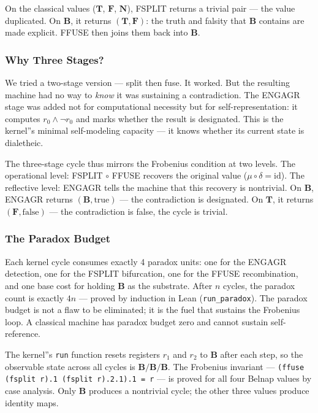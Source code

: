 \documentclass[12pt,a4paper]{article}
\begin{document}
On the classical values ($\mathbf{T}$, $\mathbf{F}$, $\mathbf{N}$), FSPLIT returns a trivial pair --- the value duplicated. On $\mathbf{B}$, it returns $(\mathbf{T}, \mathbf{F})$: the truth and falsity that $\mathbf{B}$ contains are made explicit. FFUSE then joins them back into $\mathbf{B}$.

\subsubsection{Why Three Stages?}

We tried a two-stage version --- split then fuse. It worked. But the resulting machine had no way to \emph{know} it was sustaining a contradiction. The ENGAGR stage was added not for computational necessity but for self-representation: it computes $r_0 \land \neg r_0$ and marks whether the result is designated. This is the kernel''s minimal self-modeling capacity --- it knows whether its current state is dialetheic.

The three-stage cycle thus mirrors the Frobenius condition at two levels. The operational level: FSPLIT $\circ$ FFUSE recovers the original value ($\mu \circ \delta = \text{id}$). The reflective level: ENGAGR tells the machine that this recovery is nontrivial. On $\mathbf{B}$, ENGAGR returns $(\mathbf{B}, \text{true})$ --- the contradiction is designated. On $\mathbf{T}$, it returns $(\mathbf{F}, \text{false})$ --- the contradiction is false, the cycle is trivial.

\subsubsection{The Paradox Budget}

Each kernel cycle consumes exactly 4 paradox units: one for the ENGAGR detection, one for the FSPLIT bifurcation, one for the FFUSE recombination, and one base cost for holding $\mathbf{B}$ as the substrate. After $n$ cycles, the paradox count is exactly $4n$ --- proved by induction in Lean (\texttt{run\_paradox}). The paradox budget is not a flaw to be eliminated; it is the fuel that sustains the Frobenius loop. A classical machine has paradox budget zero and cannot sustain self-reference.

The kernel''s \texttt{run} function resets registers $r_1$ and $r_2$ to $\mathbf{B}$ after each step, so the observable state across all cycles is $\mathbf{B}/\mathbf{B}/\mathbf{B}$. The Frobenius invariant --- \texttt{(ffuse (fsplit r).1 (fsplit r).2.1).1 = r} --- is proved for all four Belnap values by case analysis. Only $\mathbf{B}$ produces a nontrivial cycle; the other three values produce identity maps.
\end{document}
